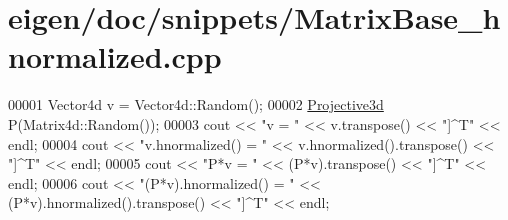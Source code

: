 \hypertarget{eigen_2doc_2snippets_2_matrix_base__hnormalized_8cpp_source}{}\section{eigen/doc/snippets/\+Matrix\+Base\+\_\+hnormalized.cpp}
\label{eigen_2doc_2snippets_2_matrix_base__hnormalized_8cpp_source}

\begin{DoxyCode}
00001 Vector4d v = Vector4d::Random();
00002 \hyperlink{group___geometry___module_gab9cec8c457da930391eb73370e07aaae}{Projective3d} P(Matrix4d::Random());
00003 cout << \textcolor{stringliteral}{"v                   = "} << v.transpose() << \textcolor{stringliteral}{"]^T"} << endl;
00004 cout << \textcolor{stringliteral}{"v.hnormalized()     = "} << v.hnormalized().transpose() << \textcolor{stringliteral}{"]^T"} << endl;
00005 cout << \textcolor{stringliteral}{"P*v                 = "} << (P*v).transpose() << \textcolor{stringliteral}{"]^T"} << endl;
00006 cout << \textcolor{stringliteral}{"(P*v).hnormalized() = "} << (P*v).hnormalized().transpose() << \textcolor{stringliteral}{"]^T"} << endl;
\end{DoxyCode}
